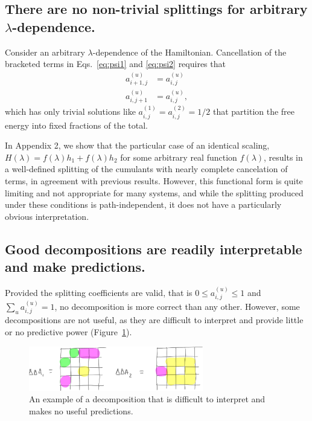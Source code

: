 \documentclass{article}
\begin{document}
\subsection{There are no non-trivial splittings for arbitrary $\lambda$-dependence.}

Consider an arbitrary $\lambda$-dependence of the Hamiltonian. Cancellation of the bracketed terms in Eqs.~\ref{eq:psi1} and \ref{eq:psi2} requires that
\begin{align*}
a_{i+1,j}^{(u)} &= a_{i,j}^{(u)} \\
a_{i,j+1}^{(u)} &= a_{i,j}^{(u)},
\end{align*}
which has only trivial solutions like $a_{i,j}^{(1)} = a_{i,j}^{(2)} = 1/2$ that partition the free energy into fixed fractions of the total.

In Appendix 2, we show that the particular case of an identical scaling, $H(\lambda) = f(\lambda)h_1 + f(\lambda)h_2$ for some arbitrary real function $f(\lambda)$, results in a well-defined splitting of the cumulants with nearly complete cancelation of terms, in agreement with previous results. However, this functional form is quite limiting and not appropriate for many systems, and while the splitting produced under these conditions is path-independent, it does not have a particularly obvious interpretation.








\subsection{Good decompositions are readily interpretable and make predictions.}

Provided the splitting coefficients are valid, that is $0 \le a_{i,j}^{(u)} \le 1$ and $\sum_u a_{i,j}^{(u)}=1$, no decomposition is more correct than any other. However, some decompositions are not useful, as they are difficult to interpret and provide little or no predictive power (Figure~\ref{fig:bad_split}).

\begin{figure}[tb]
\centering
\includegraphics[width=3in]{figure6.pdf}
\caption{An example of a decomposition that is difficult to interpret and makes no useful predictions.}
\label{fig:bad_split}
\end{figure}
\end{document}
